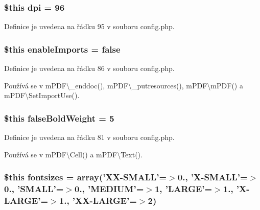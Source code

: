 \hypertarget{config_8php_ab7ce7dd9fef2e7d36bc3da8e0974a06e}{
\subsubsection[{dpi}]{\setlength{\rightskip}{0pt plus 5cm}\$this dpi = 96}}\label{config_8php_ab7ce7dd9fef2e7d36bc3da8e0974a06e}


Definice je uvedena na řádku 95 v souboru config.\-php.

\hypertarget{config_8php_ad7ba429e10a7606fa2c5f25849d5f3ea}{
\subsubsection[{enable\-Imports}]{\setlength{\rightskip}{0pt plus 5cm}\$this enable\-Imports = {\bf false}}}\label{config_8php_ad7ba429e10a7606fa2c5f25849d5f3ea}


Definice je uvedena na řádku 86 v souboru config.\-php.



Používá se v m\-P\-D\-F\textbackslash{}\-\_\-enddoc(), m\-P\-D\-F\textbackslash{}\-\_\-putresources(), m\-P\-D\-F\textbackslash{}m\-P\-D\-F() a m\-P\-D\-F\textbackslash{}\-Set\-Import\-Use().

\hypertarget{config_8php_ab8ee0c261b128b4ebd36f9a9635f37dc}{
\subsubsection[{false\-Bold\-Weight}]{\setlength{\rightskip}{0pt plus 5cm}\$this false\-Bold\-Weight = 5}}\label{config_8php_ab8ee0c261b128b4ebd36f9a9635f37dc}


Definice je uvedena na řádku 81 v souboru config.\-php.



Používá se v m\-P\-D\-F\textbackslash{}\-Cell() a m\-P\-D\-F\textbackslash{}\-Text().

\hypertarget{config_8php_a63a6e1dc15845eaeb2775706e40dd49d}{
\subsubsection[{fontsizes}]{\setlength{\rightskip}{0pt plus 5cm}\$this fontsizes = array('X\-X-\/S\-M\-A\-L\-L'=$>$0., 'X-\/S\-M\-A\-L\-L'=$>$0., 'S\-M\-A\-L\-L'=$>$0., 'M\-E\-D\-I\-U\-M'=$>$1, 'L\-A\-R\-G\-E'=$>$1., 'X-\/L\-A\-R\-G\-E'=$>$1., 'X\-X-\/L\-A\-R\-G\-E'=$>$2)}}\label{config_8php_a63a6e1dc15845eaeb2775706e40dd49d}


